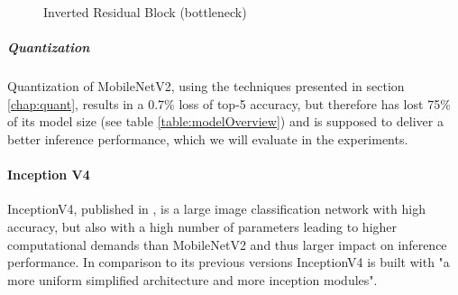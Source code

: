 \begin{figure}[!htb]
\centering
   \resizebox{.7\linewidth}{!}{}
\caption{Inverted Residual Block (bottleneck)}
\label{fig:bottleneckBlock}
\end{figure}

\subparagraph{Quantization}
Quantization of MobileNetV2, using the techniques presented in section \ref{chap:quant}, results in a  0.7\% loss of top-5 accuracy, but therefore has lost 75\% of its model size (see table \ref{table:modelOverview}) and is supposed to deliver a better inference performance, which we will evaluate in the experiments.



\paragraph{Inception V4}
InceptionV4, published in \cite{InceptionV4}, is a large image classification network with high accuracy, but also with a high number of parameters leading to higher computational demands than MobileNetV2 and thus larger impact on inference performance.
In comparison to its previous versions InceptionV4 is built with "a more uniform simplified architecture and more inception modules". 

